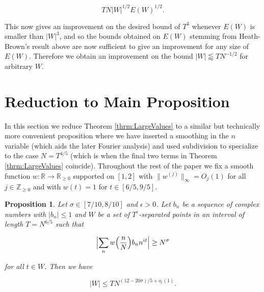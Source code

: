 \documentclass{amsart}
\theoremstyle{plain}
\newtheorem{prpstn}[thrm]{Proposition}
\numberwithin{equation}{section}
\begin{document}
\[
T N |W|^{1/2}E(W)^{1/2}.
\]

This now gives an improvement on the desired bound of $T^3$ whenever $E(W)$ is smaller than $|W|^3$, and so the bounds obtained on $E(W)$ stemming from Heath-Brown's result above are now sufficient to give an improvement for any size of $E(W)$. Therefore we obtain an improvement on the bound $|W|\lessapprox TN^{-1/2}$ for arbitrary $W$.

%
%
%
%

\section{Reduction to Main Proposition}\label{secredmain}

In this section we reduce Theorem \ref{thrm:LargeValues} to a similar but technically more convenient proposition where we have inserted a smoothing in the $n$ variable (which aids the later Fourier analysis) and used subdivision to specialize to the case $N=T^{4/5}$ (which is when the final two terms in Theorem \ref{thrm:LargeValues} coincide). Throughout the rest of the paper we fix a smooth function $w:\mathbb{R}\rightarrow\mathbb{R}_{\ge 0}$ supported on $[1,2]$ with $\|w^{(j)}\|_\infty=O_j(1)$ for all $j\in \mathbb{Z}_{\ge 0}$ and with $w(t)=1$ for $t\in [6/5,9/5]$.

%
%


\begin{prpstn}\label{prpstn:KeyProp}
Let $\sigma\in [7/10,8/10]$ and $\epsilon>0$. Let $b_n$ be a sequence of complex numbers with $|b_n| \le 1$ and $W$ be a set of $T^\epsilon$-separated points in an interval of length $T=N^{6/5}$ such that

\[
\Bigl|\sum_n w\Bigl(\frac{n}{N}\Bigr)b_n n^{it}\Bigr|\ge N^\sigma
\]

for all $t\in W$. Then we have

\[
|W|\le TN^{(12-20\sigma)/5+o_\epsilon(1)}.
\]

\end{prpstn}
\end{document}
